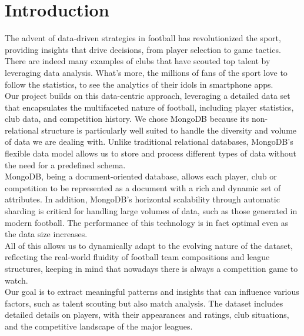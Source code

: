 \documentclass{Configuration_Files/PoliMi3i_thesis}
\begin{document}
\mainmatter %

\chapter{Introduction}
\label{ch:chapter_one}%

The advent of data-driven strategies in football has revolutionized the sport, providing insights that drive decisions, from player selection to game tactics. There are indeed many examples of clubs that have scouted top talent by leveraging data analysis. What's more, the millions of fans of the sport love to follow the statistics, to see the analytics of their idols in smartphone apps.\\
Our project builds on this data-centric approach, leveraging a detailed data set that encapsulates the multifaceted nature of football, including player statistics, club data, and competition history. We chose MongoDB because its non-relational structure is particularly well suited to handle the diversity and volume of data we are dealing with. Unlike traditional relational databases, MongoDB's flexible data model allows us to store and process different types of data without the need for a predefined schema.\\
MongoDB, being a document-oriented database, allows each player, club or competition to be represented as a document with a rich and dynamic set of attributes. In addition, MongoDB's horizontal scalability through automatic sharding is critical for handling large volumes of data, such as those generated in modern football. The performance of this technology is in fact optimal even as the data size increases. \\
All of this allows us to dynamically adapt to the evolving nature of the dataset, reflecting the real-world fluidity of football team compositions and league structures, keeping in mind that nowadays there is always a competition game to watch.\\
Our goal is to extract meaningful patterns and insights that can influence various factors, such as talent scouting but also match analysis. The dataset includes detailed details on players, with their appearances and ratings, club situations, and the competitive landscape of the major leagues.
\end{document}

